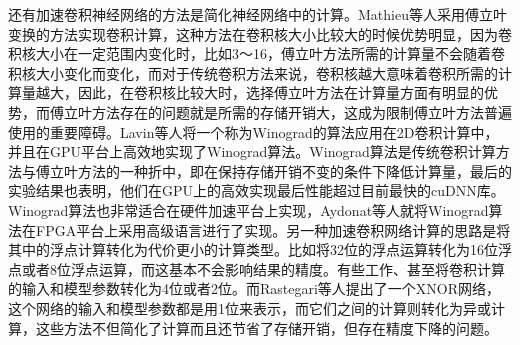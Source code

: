 还有加速卷积神经网络的方法是简化神经网络中的计算。Mathieu等人采用傅立叶变换的方法实现卷积计算，这种方法在卷积核大小比较大的时候优势明显，因为卷积核大小在一定范围内变化时，比如3～16，傅立叶方法所需的计算量不会随着卷积核大小变化而变化，而对于传统卷积方法来说，卷积核越大意味着卷积所需的计算量越大，因此，在卷积核比较大时，选择傅立叶方法在计算量方面有明显的优势，而傅立叶方法存在的问题就是所需的存储开销大，这成为限制傅立叶方法普遍使用的重要障碍。Lavin等人将一个称为Winograd的算法应用在2D卷积计算中，并且在GPU平台上高效地实现了Winograd算法。Winograd算法是传统卷积计算方法与傅立叶方法的一种折中，即在保持存储开销不变的条件下降低计算量，最后的实验结果也表明，他们在GPU上的高效实现最后性能超过目前最快的cuDNN库。Winograd算法也非常适合在硬件加速平台上实现，Aydonat等人就将Winograd算法在FPGA平台上采用高级语言进行了实现。另一种加速卷积网络计算的思路是将其中的浮点计算转化为代价更小的计算类型。比如将32位的浮点运算转化为16位浮点或者8位浮点运算，而这基本不会影响结果的精度。有些工作、甚至将卷积计算的输入和模型参数转化为4位或者2位。而Rastegari等人提出了一个XNOR网络，这个网络的输入和模型参数都是用1位来表示，而它们之间的计算则转化为异或计算，这些方法不但简化了计算而且还节省了存储开销，但存在精度下降的问题。

